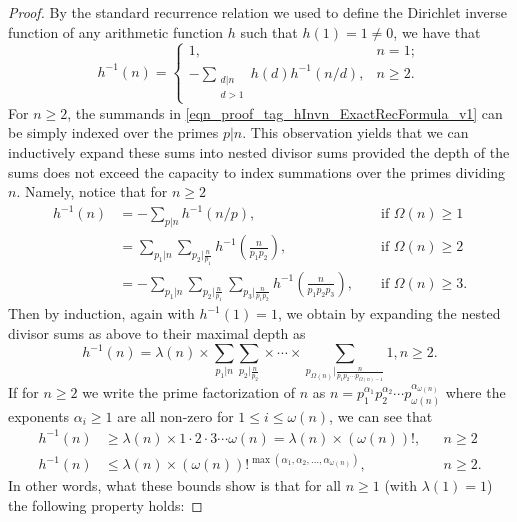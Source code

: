 \documentclass[11pt,reqno,a4letter]{article}
\numberwithin{figure}{section}
\numberwithin{table}{section}
\theoremstyle{plain}
\numberwithin{theorem}{section}
\theoremstyle{definition}
\begin{document}
\begin{proof}
By the standard recurrence relation we used to define the Dirichlet inverse function of any 
arithmetic function $h$ such that $h(1) = 1 \neq 0$, 
we have that 
\begin{equation} 
\label{eqn_proof_tag_hInvn_ExactRecFormula_v1}
h^{-1}(n) = \begin{cases} 
            1, & n = 1; \\ 
            -\sum\limits_{\substack{d|n \\ d>1}} h(d) h^{-1}(n/d), & n \geq 2. 
            \end{cases} 
\end{equation} 
For $n \geq 2$, the summands in \eqref{eqn_proof_tag_hInvn_ExactRecFormula_v1} 
can be simply indexed over the primes $p|n$. This observation yields that we can inductively 
expand these sums into nested divisor sums provided the depth of the sums does not exceed the 
capacity to index summations over the primes dividing $n$. Namely, notice that for $n \geq 2$ 
\begin{align*} 
h^{-1}(n) & = -\sum_{p|n} h^{-1}(n/p), && \text{\ if\ } \Omega(n) \geq 1 \\ 
     & = \sum_{p_1|n} \sum_{p_2|\frac{n}{p_1}} h^{-1}\left(\frac{n}{p_1p_2}\right), && \text{\ if\ } \Omega(n) \geq 2 \\ 
     & = -\sum_{p_1|n} \sum_{p_2|\frac{n}{p_1}} \sum_{p_3|\frac{n}{p_1p_2}} h^{-1}\left(\frac{n}{p_1p_2p_3}\right), 
     && \text{\ if\ } \Omega(n) \geq 3. 
\end{align*} 
Then by induction, again with $h^{-1}(1) = 1$, we obtain by expanding the 
nested divisor sums as above to their maximal depth as 
\[
h^{-1}(n) = \lambda(n) \times \sum_{p_1|n} \sum_{p_2|\frac{n}{p_2}} \times \cdots \times 
     \sum_{p_{\Omega(n)}|\frac{n}{p_1p_2 \cdots p_{\Omega(n)-1}}} 1, n \geq 2. 
\]
If for $n \geq 2$ we write the prime factorization of $n$ as 
$n = p_1^{\alpha_1} p_2^{\alpha_2} \cdots p_{\omega(n)}^{\alpha_{\omega(n)}}$ where the exponents $\alpha_i \geq 1$ are all 
non-zero for $1 \leq i \leq \omega(n)$, we can see that 
\begin{align*} 
h^{-1}(n) & \geq \lambda(n) \times 1 \cdot 2 \cdot 3 \cdots \omega(n) = \lambda(n) \times (\omega(n))!, && n \geq 2 \\ 
h^{-1}(n) & \leq \lambda(n) \times (\omega(n))!^{\max(\alpha_1, \alpha_2, \ldots, \alpha_{\omega(n)})}, && n \geq 2. 
\end{align*} 
In other words, what these bounds show is that for all $n \geq 1$ (with $\lambda(1) = 1$) the following property holds: 

\end{proof}
\end{document}
